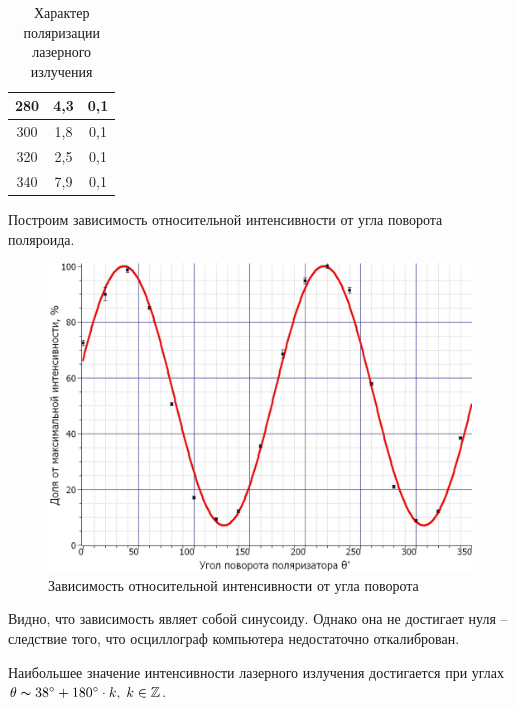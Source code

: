 \documentclass[a4paper,12pt]{article} %
\begin{document}
\begin{table}[h!]
\begin{tabular}{|c|c|c|}
			280                                        & 4,3                                      & 0,1                         \\ \hline
			300                                        & 1,8                                      & 0,1                         \\ \hline
			320                                        & 2,5                                      & 0,1                         \\ \hline
			340                                        & 7,9                                      & 0,1                         \\ \hline
		\end{tabular}
	\caption{Характер поляризации лазерного излучения}
	\end{table}

	\newpage

	Построим зависимость относительной интенсивности от угла поворота поляроида.
	
	\begin{figure}[h!]
		\centering
		\includegraphics[scale=0.7]{Pictures/Поляризация}
		\caption{Зависимость относительной интенсивности от угла поворота}
	\end{figure}

	Видно, что зависимость являет собой синусоиду. Однако она не достигает нуля -- следствие того, что осциллограф компьютера недостаточно откалиброван.
	
	Наибольшее значение интенсивности лазерного излучения достигается при углах $\theta \thicksim 38 ^\circ + 180^\circ \cdot k, \; k\in \mathbb{Z}$.
\end{document}
